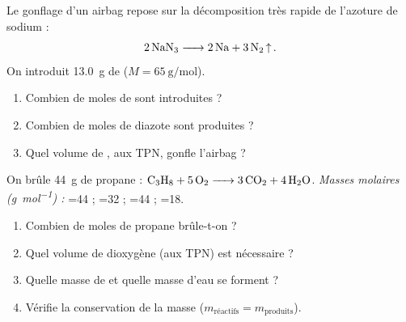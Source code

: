 \documentclass[11pt,a4paper]{article}
\begin{document}
\begin{exo}
Le gonflage d'un airbag repose sur la décomposition très rapide de l'azoture de sodium :
\[ \ce{2 NaN3 -> 2 Na + 3 N2 ^}. \]
On introduit \SI{13,0}{\gram} de  ($M=\SI{65}{\gram\per\mole}$).
\begin{enumerate}[label=\textbf{\alph*)},leftmargin=2em,topsep=1pt,itemsep=1.5pt]
  \item Combien de moles de  sont introduites ?
  \item Combien de moles de diazote  sont produites ?
  \item Quel volume de , aux TPN, gonfle l'airbag ?
\end{enumerate}
\end{exo}

\begin{exo}
On brûle \SI{44}{\gram} de propane : $\ce{C3H8 + 5 O2 -> 3 CO2 + 4 H2O}$.
\emph{Masses molaires (\si{\gram\per\mole}) :} =44 ; =32 ; =44 ; =18.
\begin{enumerate}[label=\textbf{\alph*)},leftmargin=2em,topsep=1pt,itemsep=1.5pt]
  \item Combien de moles de propane brûle-t-on ?
  \item Quel volume de dioxygène (aux TPN) est nécessaire ?
  \item Quelle masse de  et quelle masse d'eau se forment ?
  \item Vérifie la conservation de la masse ($m_{\text{réactifs}}=m_{\text{produits}}$).
\end{enumerate}
\end{exo}
\end{document}
